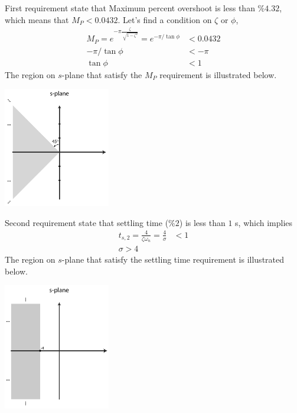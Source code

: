 \documentclass[twoside]{article}
\begin{document}
First requirement state that Maximum percent overshoot is less than $\%4.32$, which means that $M_P < 0.0432$.
Let's find a condition on $\zeta$ or $\phi$,
\begin{align*}
  M_P = e^{-\pi  \frac{\zeta}{\ \sqrt{1 - \zeta^2}}} = e^{-\pi / \tan \phi} &< 0.0432 \\
  -\pi / \tan \phi &< -\pi \\
  \tan \phi &< 1
\end{align*}
%
The region on $s$-plane that satisfy the $M_P$ requirement is illustrated below. 

     \begin{minipage}[h]{1\linewidth}
    \begin{center}
     \includegraphics[width=0.35\textwidth]{damping}
    \end{center}
  \end{minipage}
  
Second requirement state that settling time ($\%2$) is less than $1$ s, which implies
%
\begin{align*}
  t_{s,2} = \frac{4}{\zeta \omega_n} = \frac{4}{\sigma} &< 1\\
  \sigma >  4
\end{align*}
%
The region on $s$-plane that satisfy the settling time requirement is illustrated below. 

     \begin{minipage}[h]{1\linewidth}
    \begin{center}
     \includegraphics[width=0.35\textwidth]{settling}
    \end{center}
  \end{minipage}
  
\end{document}
